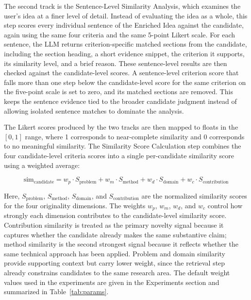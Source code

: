 The second track is the Sentence-Level Similarity Analysis, which examines the user's idea at a finer level of detail. Instead of evaluating the idea as a whole, this step scores every individual sentence of the Enriched Idea against the candidate, again using the same four criteria and the same 5-point Likert scale. For each sentence, the LLM returns criterion-specific matched sections from the candidate, including the section heading, a short evidence snippet, the criterion it supports, its similarity level, and a brief reason. These sentence-level results are then checked against the candidate-level scores. A sentence-level criterion score that falls more than one step below the candidate-level score for the same criterion on the five-point scale is set to zero, and its matched sections are removed. This keeps the sentence evidence tied to the broader candidate judgment instead of allowing isolated sentence matches to dominate the analysis.

The Likert scores produced by the two tracks are then mapped to floats in the $[0, 1]$ range, where 1 corresponds to near-complete similarity and 0 corresponds to no meaningful similarity. The Similarity Score Calculation step combines the four candidate-level criteria scores into a single per-candidate similarity score using a weighted average:

\begin{equation}
	\text{sim}_{\text{candidate}} =
	w_p \cdot S_{\text{problem}}
	+ w_m \cdot S_{\text{method}}
	+ w_d \cdot S_{\text{domain}}
	+ w_c \cdot S_{\text{contribution}}
\label{eq:sim_candidate}
\end{equation}

Here, $S_{\text{problem}}$, $S_{\text{method}}$, $S_{\text{domain}}$, and $S_{\text{contribution}}$ are the normalized similarity scores for the four originality dimensions. The weights $w_p$, $w_m$, $w_d$, and $w_c$ control how strongly each dimension contributes to the candidate-level similarity score. Contribution similarity is treated as the primary novelty signal because it captures whether the candidate already makes the same substantive claim; method similarity is the second strongest signal because it reflects whether the same technical approach has been applied. Problem and domain similarity provide supporting context but carry lower weight, since the retrieval step already constrains candidates to the same research area. The default weight values used in the experiments are given in the Experiments section and summarized in Table~\ref{tab:params}.

